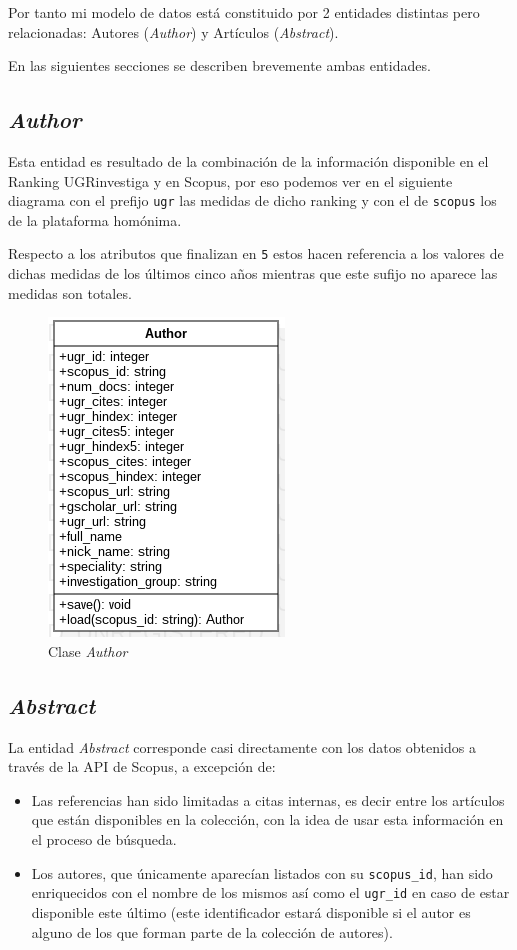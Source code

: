 Por tanto mi modelo de datos está constituido por 2 entidades distintas pero relacionadas: Autores (\textit{Author}) y Artículos (\textit{Abstract}). 

En las siguientes secciones se describen brevemente ambas entidades.


\subsection{\textit{Author}}
\label{subsc:author}
Esta entidad es resultado de la combinación de la información disponible en el Ranking UGRinvestiga \cite{Ranking_UGRInvestiga} y en Scopus, por eso podemos ver en el siguiente diagrama con el prefijo \texttt{ugr} las medidas de dicho ranking y con el de \texttt{scopus} los de la plataforma homónima. 

Respecto a los atributos que finalizan en \texttt{5} estos hacen referencia a los valores de dichas medidas de los últimos cinco años mientras que este sufijo no aparece las medidas son totales.

\begin{figure}[ht]
	
	\centering
	\includegraphics[width=0.4\linewidth]{imagenes/Author}
	\caption{Clase \textit{Author}}
\end{figure}

\newpage

\subsection{\textit{Abstract}}
\label{subsc:abstract}
La entidad \textit{Abstract} corresponde casi directamente con los datos obtenidos a través de la \acrshort{API} de Scopus, a excepción de:
\begin{itemize}
	\item Las referencias han sido limitadas a citas internas, es decir entre los artículos que están disponibles en la colección, con la idea de usar esta información en el proceso de búsqueda.
	\item Los autores, que únicamente aparecían listados con su \texttt{scopus\_id}, han sido enriquecidos con el nombre de los mismos así como el \texttt{ugr\_id} en caso de estar disponible este último (este identificador estará disponible si el autor es alguno de los que forman parte de la colección de autores).
\end{itemize}

